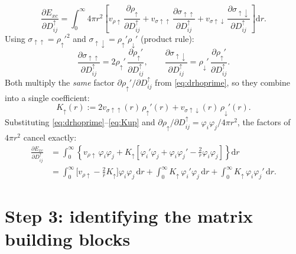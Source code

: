\documentclass[11pt,a4paper]{article}
\newcommand{\dd}{\mathrm{d}}
\newcommand{\Exc}{E_{xc}}
\newcommand{\vrho}[1]{v_{\rho#1}}
\newcommand{\vsig}[1]{v_{\sigma#1}}
\begin{document}
\begin{equation}
    \frac{\partial \Exc}{\partial D^\uparrow_{ij}}
    = \int_0^\infty 4\pi r^2\left[
        \vrho{\uparrow}\,\frac{\partial \rho_\uparrow}{\partial D^\uparrow_{ij}}
        + \vsig{\uparrow\uparrow}\,\frac{\partial \sigma_{\uparrow\uparrow}}{\partial D^\uparrow_{ij}}
        + \vsig{\uparrow\downarrow}\,\frac{\partial \sigma_{\uparrow\downarrow}}{\partial D^\uparrow_{ij}}
      \right]\dd r.
\end{equation}
Using $\sigma_{\uparrow\uparrow} = \rho_\uparrow'^2$ and
$\sigma_{\uparrow\downarrow} = \rho_\uparrow'\rho_\downarrow'$ (product rule):
\begin{equation}
    \frac{\partial \sigma_{\uparrow\uparrow}}{\partial D^\uparrow_{ij}}
        = 2\rho_\uparrow'\,\frac{\partial \rho_\uparrow'}{\partial D^\uparrow_{ij}},
    \qquad
    \frac{\partial \sigma_{\uparrow\downarrow}}{\partial D^\uparrow_{ij}}
        = \rho_\downarrow'\,\frac{\partial \rho_\uparrow'}{\partial D^\uparrow_{ij}}.
\end{equation}
Both multiply the \emph{same} factor $\partial\rho_\uparrow'/\partial D^\uparrow_{ij}$
from \eqref{eq:drhoprime}, so they combine into a single coefficient:
\begin{equation}
    K_\uparrow(r) := 2\vsig{\uparrow\uparrow}(r)\,\rho_\uparrow'(r)
        + \vsig{\uparrow\downarrow}(r)\,\rho_\downarrow'(r).
    \label{eq:Kup}
\end{equation}
Substituting \eqref{eq:drhoprime}--\eqref{eq:Kup} and
$\partial\rho_\uparrow/\partial D^\uparrow_{ij} = \varphi_i\varphi_j/4\pi r^2$,
the factors of $4\pi r^2$ cancel exactly:
\begin{align}
    \frac{\partial \Exc}{\partial D^\uparrow_{ij}}
    &= \int_0^\infty \left\{ \vrho{\uparrow}\,\varphi_i\varphi_j
        + K_\uparrow\left[\varphi_i'\varphi_j + \varphi_i\varphi_j' - \frac{2}{r}\varphi_i\varphi_j\right]\right\}\dd r \\
    &= \int_0^\infty \Big[\vrho{\uparrow} - \tfrac{2}{r}K_\uparrow\Big]\varphi_i\varphi_j\,\dd r
        + \int_0^\infty K_\uparrow\,\varphi_i'\varphi_j\,\dd r
        + \int_0^\infty K_\uparrow\,\varphi_i\varphi_j'\,\dd r.
    \label{eq:threeterms}
\end{align}

\section{Step 3: identifying the matrix building blocks}
\end{document}
